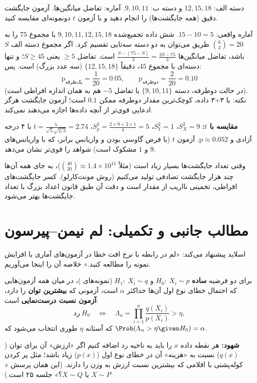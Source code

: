 \begin{example}
دسته الف: $12,15,18$ و دسته ب: $9,10,11$. آماره: تفاضل میانگین‌ها. آزمون جایگشت دقیق (همه جایگشت‌ها) را انجام دهید و با آزمون $t$ دونمونه‌ای مقایسه کنید.
\begin{solution}
آماره واقعی: $15-10=5$. شش داده تجمیع‌شده $9,10,11,12,15,18$ با مجموع $75$ را به $\binom63=20$ طریق می‌توان به دو دسته سه‌تایی تقسیم کرد. اگر مجموع دسته الف $S$ باشد، تفاضل میانگین‌ها $\frac{S-(75-S)}{3}=\frac{2S-75}{3}$ است. تفاضل $\ge5$ یعنی $S\ge45$؛ و تنها دسته‌ای با مجموع $45$، دقیقاً $\{12,15,18\}$ (سه عدد بزرگ) است. پس:
\[
\text{p}_{\text{یک‌طرفه}}=\frac{1}{20}=0.05,\qquad\text{p}_{\text{دوطرفه}}=\frac{2}{20}=0.10
\]
(در حالت دوطرفه، دسته $\{9,10,11\}$ با تفاضل $-5$ هم به همان اندازه افراطی است). نکته: با ۳+۳ داده، کوچک‌ترین مقدار  دوطرفه ممکن $0.1$ است؛ آزمون جایگشت هرگز ادعایی قوی‌تر از آنچه داده‌ها اجازه می‌دهند نمی‌کند.

\textbf{مقایسه با $t$:} $S_X^2=9$، $S_Y^2=1$، $S_p^2=\frac{2\times9+2\times1}{4}=5$، $t=\frac{5}{\sqrt5\sqrt{2/3}}=2.74$ با ۴ درجه آزادی و $\text{p}\approx0.052$. آزمون $t$ (با فرض گاوسی بودن و واریانس برابر، که با واریانس‌های $9$ و $1$ مشکوک است) شواهد را قوی‌تر نشان می‌دهد.
\end{solution}
\end{example}

\begin{note}
\notetitle وقتی تعداد جایگشت‌ها بسیار زیاد است (مثلاً $\binom{40}{20}\approx1.4\times10^{11}$)، به جای همه آن‌ها چند هزار جایگشت تصادفی تولید می‌کنیم (روش مونت‌کارلو). کسر جایگشت‌های افراطی، تخمینی نااریب از مقدار  است و دقت آن طبق قانون اعداد بزرگ با تعداد جایگشت‌ها بهتر می‌شود.
\end{note}

\section{مطالب جانبی و تکمیلی: لم نیمن--پیرسون}
اسلاید پیشنهاد می‌کند: «لم  در رابطه با نرخ افت خطا در آزمون‌های آماری با افزایش نمونه را مطالعه کنید.» خلاصه آن را اینجا می‌آوریم.

\begin{theorem}
برای دو فرضیه \textbf{ساده} $H_0:\ X_i\sim p$ و $H_1:\ X_i\sim q$ (نمونه‌های )، در میان همه آزمون‌هایی که احتمال خطای نوع اول آن‌ها حداکثر $\alpha$ است، آزمونی که \textbf{بیشترین توان} را دارد، \textbf{آزمون نسبت درست‌نمایی} است:
\[
\text{رد}\ H_0\quad\Longleftrightarrow\quad\Lambda_n=\prod_{i=1}^n\frac{q(X_i)}{p(X_i)}>\eta,
\]
که آستانه $\eta$ طوری انتخاب می‌شود که $\Prob(\Lambda_n>\eta\given H_0)=\alpha$.
\end{theorem}
\textbf{شهود:} هر نقطه داده $x$ را باید به ناحیه رد اضافه کنیم اگر «ارزش» آن برای توان ($q(x)$) نسبت به «هزینه» آن در خطای نوع اول ($p(x)$) زیاد باشد؛ مثل پر کردن کوله‌پشتی با اقلامی که بیشترین نسبت ارزش به وزن را دارند. (این همان پرسش «$X\sim P$ یا $X\sim Q$؟» جلسه ۲۵ است.)

